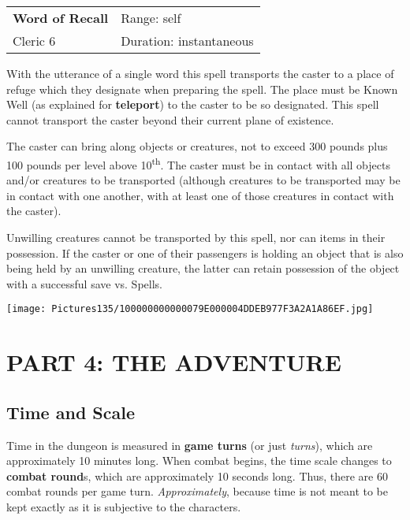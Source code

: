 \documentclass[a4paper,twoside,openany,10pt]{book}
\begin{document}
\begin{multicols}{2}
\smallskip\begin{flushleft} 
	\begin{tabularx}{0.45\textwidth}{@{}m{3.5cm}m{5.5cm}@{}} 
		\textbf{Word of Recall} & Range: self\\
Cleric 6 &Duration: instantaneous\\
	\end{tabularx}\end{flushleft}

With the utterance of a single word this spell transports the caster to a place of refuge which they designate when preparing the spell. The place must be Known Well (as explained for \textbf{teleport}) to the caster to be so designated. This spell cannot transport the caster beyond their current plane of existence.

The caster can bring along objects or creatures, not to exceed 300 pounds plus 100 pounds per level above 10\textsuperscript{th}. The caster must be in contact with all objects and/or creatures to be transported (although creatures to be transported may be in contact with one another, with at least one of those creatures in contact with the caster).

Unwilling creatures cannot be transported by this spell, nor can items in their possession. If the caster or one of their passengers is holding an object that is also being held by an unwilling creature, the latter can retain possession of the object with a successful save vs. Spells. 

\end{multicols}

\vfill

\begin{center}
	\texttt{[image: Pictures135/100000000000079E000004DDEB977F3A2A1A86EF.jpg]}
\end{center}

\pagebreak

\section{PART 4: THE ADVENTURE}\label{part-4-the-adventure}

\subsection{Time and Scale}\label{time-and-scale}

Time in the dungeon is measured in \textbf{game turns} (or just \emph{turns}), which are approximately 10 minutes long. When combat begins, the time scale changes to \textbf{combat round}s, which are approximately 10 seconds long. Thus, there are 60 combat rounds per game turn. \emph{Approximately}, because time is not meant to be kept exactly as it is subjective to the characters.
\end{document}
